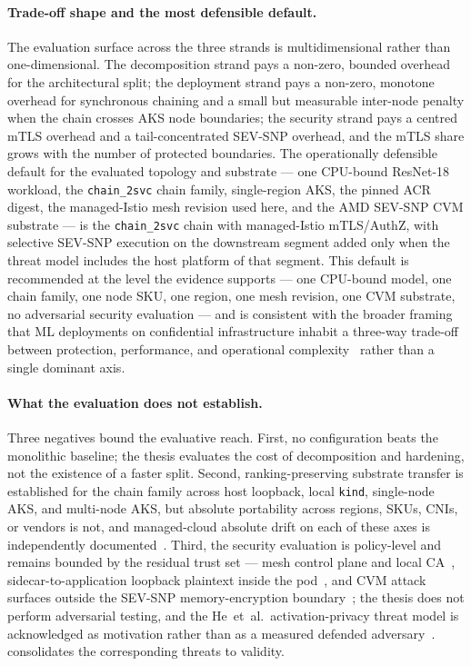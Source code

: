 \paragraph{Trade-off shape and the most defensible default.}
The evaluation surface across the three strands is multidimensional
rather than one-dimensional. The decomposition strand pays a
non-zero, bounded overhead for the architectural split; the
deployment strand pays a non-zero, monotone overhead for synchronous
chaining and a small but measurable inter-node penalty when the
chain crosses AKS node boundaries; the security strand pays a
centred mTLS overhead and a tail-concentrated SEV-SNP overhead, and
the mTLS share grows with the number of protected boundaries. The
operationally defensible default for the evaluated topology and
substrate --- one CPU-bound ResNet-18 workload, the
\texttt{chain\_2svc} chain family, single-region AKS, the pinned
ACR digest, the managed-Istio mesh revision used here, and the
AMD SEV-SNP CVM substrate --- is the \texttt{chain\_2svc} chain
with managed-Istio mTLS/AuthZ, with selective SEV-SNP execution on
the downstream segment added only when the threat model includes
the host platform of that segment. This default is recommended at the
level the evidence supports --- one CPU-bound model, one chain
family, one node SKU, one region, one mesh revision, one CVM
substrate, no adversarial security evaluation --- and is consistent
with the broader framing that ML deployments on confidential
infrastructure inhabit a three-way trade-off between protection,
performance, and operational
complexity~\cite{mo2024_ml_confidential_computing} rather than a
single dominant axis.

\paragraph{What the evaluation does not establish.}
Three negatives bound the evaluative reach. First, no configuration
beats the monolithic baseline; the thesis evaluates the cost of
decomposition and hardening, not the existence of a faster split.
Second, ranking-preserving substrate transfer is established for the
chain family across host loopback, local \texttt{kind}, single-node
AKS, and multi-node AKS, but absolute portability across regions,
SKUs, CNIs, or vendors is not, and managed-cloud absolute drift on
each of these axes is independently
documented~\cite{managed_k8s_perf,virtualization_costs,cni_k8s_ic2e21,%
noise_in_clouds}. Third, the security evaluation is policy-level and
remains bounded by the residual trust set --- mesh control plane and
local CA~\cite{poudel2025mazu}, sidecar-to-application loopback
plaintext inside the pod~\cite{meshinsight_socc23}, and CVM
attack surfaces outside the SEV-SNP memory-encryption
boundary~\cite{schluter2024_heckler}; the thesis does not perform
adversarial testing, and the He~et~al.\ activation-privacy threat
model is acknowledged as motivation rather than as a measured
defended adversary~\cite{he2021_attacking_collaborative}.
 consolidates the corresponding threats
to validity.
